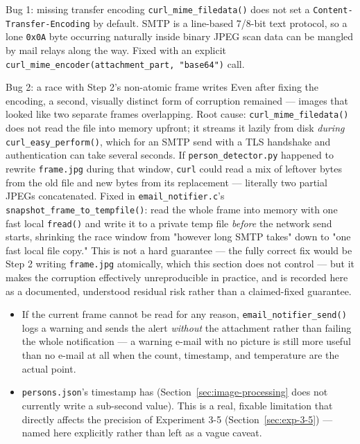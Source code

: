 
\begin{resultbox}{Bug 1: missing transfer encoding}
\texttt{curl\_mime\_filedata()} does not set a
\texttt{Content-Transfer-Encoding} by default. SMTP is a line-based
7/8-bit text protocol, so a lone \texttt{0x0A} byte occurring naturally
inside binary JPEG scan data can be mangled by mail relays along the way.
Fixed with an explicit \texttt{curl\_mime\_encoder(attachment\_part,
"base64")} call.
\end{resultbox}

\begin{resultbox}{Bug 2: a race with Step 2's non-atomic frame writes}
Even after fixing the encoding, a second, visually distinct form of
corruption remained --- images that looked like two separate frames
overlapping. Root cause: \texttt{curl\_mime\_filedata()} does not read
the file into memory upfront; it streams it lazily from disk
\emph{during} \texttt{curl\_easy\_perform()}, which for an SMTP send with
a TLS handshake and authentication can take several seconds. If
\texttt{person\_detector.py} happened to rewrite \texttt{frame.jpg}
during that window, \texttt{curl} could read a mix of leftover bytes
from the old file and new bytes from its replacement --- literally two
partial JPEGs concatenated. Fixed in \texttt{email\_notifier.c}'s
\texttt{snapshot\_frame\_to\_tempfile()}: read the whole frame into
memory with one fast local \texttt{fread()} and write it to a private
temp file \emph{before} the network send starts, shrinking the race
window from "however long SMTP takes" down to "one fast local file
copy." This is not a hard guarantee --- the fully correct fix would be
Step 2 writing \texttt{frame.jpg} atomically, which this section does not
control --- but it makes the corruption effectively unreproducible in
practice, and is recorded here as a documented, understood residual risk
rather than a claimed-fixed guarantee.
\end{resultbox}


\begin{itemize}
    \item If the current frame cannot be read for any reason,
    \texttt{email\_notifier\_send()} logs a warning and sends the alert
    \emph{without} the attachment rather than failing the whole
    notification --- a warning e-mail with no picture is still more
    useful than no e-mail at all when the count, timestamp, and
    temperature are the actual point.
    \item \texttt{persons.json}'s timestamp has  (Section~\ref{sec:image-processing} does not currently
    write a sub-second value). This is a real, fixable limitation that
    directly affects the precision of Experiment 3-5
    (Section~\ref{sec:exp-3-5}) --- named here explicitly rather than
    left as a vague caveat.
\end{itemize}

